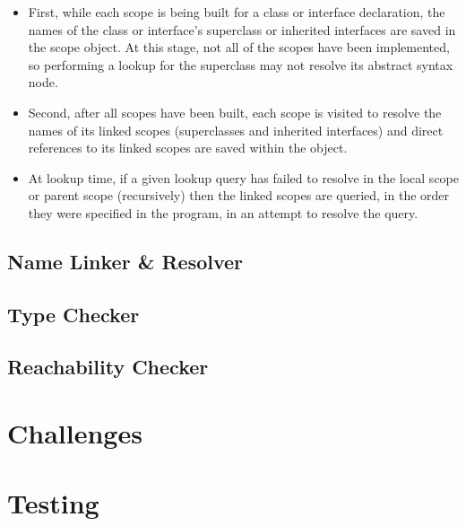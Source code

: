\documentclass[letterpaper]{article}
\begin{document}
  \begin{itemize}
    \item First, while each scope is being built for a class or interface
    declaration, the names of the class or interface's superclass or inherited
    interfaces are saved in the scope object. At this stage, not all of the
    scopes have been implemented, so performing a lookup for the superclass
    may not resolve its abstract syntax node.

    \item Second, after all scopes have been built, each scope is visited to
    resolve the names of its linked scopes (superclasses and inherited interfaces)
    and direct references to its linked scopes are saved within the object.

    \item At lookup time, if a given lookup query has failed to resolve in
    the local scope or parent scope (recursively) then the linked scopes are
    queried, in the order they were specified in the program, in an attempt
    to resolve the query.
  \end{itemize}

  \subsection{Name Linker \& Resolver}

  

  \subsection{Type Checker}
  \subsection{Reachability Checker}

  \section{Challenges}

  \section{Testing}
\end{document}
